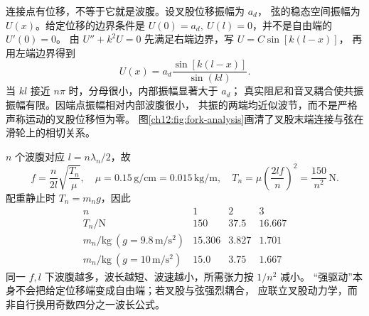 \begin{xesolution}
连接点有位移，不等于它就是波腹。设叉股位移振幅为 $a_d$，
弦的稳态空间振幅为 $U(x)$。给定位移的边界条件是
$U(0)=a_d,\ U(l)=0$，并不是自由端的 $U'(0)=0$。
由 $U''+k^2U=0$ 先满足右端边界，写 $U=C\sin[k(l-x)]$，
再用左端边界得到
\[
 U(x)=a_d\frac{\sin[k(l-x)]}{\sin(kl)}.
\]
当 $kl$ 接近 $n\pi$ 时，分母很小，内部振幅显著大于 $a_d$；
真实阻尼和音叉耦合使共振振幅有限。因端点振幅相对内部波腹很小，
共振的两端均近似波节，而不是严格声称运动的叉股位移恒为零。
图\ref{ch12:fig:fork-analysis}画清了叉股末端连接与弦在滑轮上的相切关系。

\begin{center}
\label{ch12:fig:fork-analysis}
\end{center}

$n$ 个波腹对应 $l=n\lambda_n/2$，故
\[
 f=\frac{n}{2l}\sqrt{\frac{T_n}{\mu}},\quad
 \mu=0.15\,\mathrm{g/cm}=0.015\,\mathrm{kg/m},\quad
 T_n=\mu\left(\frac{2lf}{n}\right)^2=\frac{150}{n^2}\,\mathrm N.
\]
配重静止时 $T_n=m_ng$，因此
\[
\begin{array}{c|ccc}
 n&1&2&3\\ \hline
 T_n/\mathrm N&150&37.5&16.667\\
 m_n/\mathrm{kg}\ (g=9.8\,\mathrm{m/s^2})&15.306&3.827&1.701\\
 m_n/\mathrm{kg}\ (g=10\,\mathrm{m/s^2})&15.0&3.75&1.667
\end{array}
\]
同一 $f,l$ 下波腹越多，波长越短、波速越小，所需张力按 $1/n^2$ 减小。
“强驱动”本身不会把给定位移端变成自由端；若叉股与弦强烈耦合，
应联立叉股动力学，而非自行换用奇数四分之一波长公式。
\end{xesolution}

